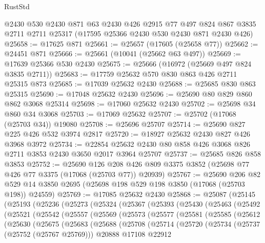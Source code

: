 \begin{lexlean}{RustStd}
\begin{coremodule}
    @2430
    @530
    @2430
    @871
    @63
    @2430
    @426
    @2915
    @77
    @497
    @824
    @867
    @3835
    @2711
    @2711
    @25317
    (@17595 @25366 @2430 @530 @2430 @871 @2430 @426)
@25658 := @17625 @871
@25661 := @25657 (@17605 (@25658 @77))
@25662 := @24451 @871
@25666 := @25661 (@10041 (@25662 @63 @497))
@25669 := @17639 @25366 @530 @2430
@25675 := @25666 (@16972 (@25669 @497 @824 @3835 @2711))
@25683 := @17759 @25632 @570 @830 @863 @426 @2711 @25315 @873
@25685 := @17039 @25632 @2430
@25688 := @25685 @830 @863 @25315
@25690 := @17048 @25632 @2430
@25696 := @25690 @80 @829 @860 @862 @3068 @25314
@25698 := @17060 @25632 @2430
@25702 := @25698 @34 @860 @34 @3068
@25703 := @17069 @25632
@25707 := @25702 (@17068 (@25703 @34)) @19080
@25708 := @25696 @25707
@25714 := @25690 @827 @225 @426 @532 @3974 @2817
@25720 := @18927 @25632 @2430 @827 @426 @3968 @3972
@25734 := @22854 @25632 @2430 @80 @858 @426 @3068 @826 @2711 @3853 @2430 @3650 @2017 @3964 @25707
@25737 := @25685 @826 @858 @3853
@25752 := @25690
    @126
    @208
    @426
    @809
    @3375
    @3852
    (@25698 @77 @426 @77 @3375 (@17068 (@25703 @77)) @20939)
@25767 := @25690
    @206
    @82
    @529
    @14
    @3850
    @2695
    (@25698 @198 @529 @198 @3850 (@17068 (@25703 @198)) @24559)
@25769 := @17085 @25632 @2430
@25868 := @25087
    (@25145
      (@25193
        (@25236
          (@25273
            (@25324
              (@25367
                (@25393
                  (@25430
                    (@25463
                      (@25492
                        (@25521
                          (@25542
                            (@25557
                              (@25569
                                (@25573
                                  (@25577
                                    (@25581
                                      (@25585
                                        (@25612
                                          (@25630
                                            (@25675
                                              (@25683
                                                (@25688
                                                  (@25708
                                                    (@25714
                                                      (@25720
                                                        (@25734
                                                          (@25737 (@25752 (@25767 @25769)))
                                                          @20888
                                                          @17108
                                                          @22912

\end{coremodule}
\end{lexlean}

